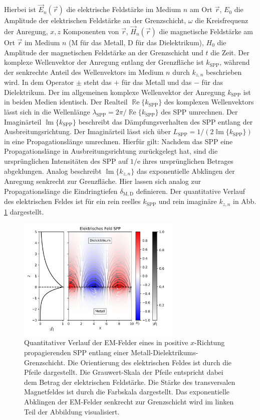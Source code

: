 \documentclass[a4paper, titlepage,  ngerman]{book}
\renewcommand{\Re}{\operatorname{\mathbb{R}e}}
\renewcommand{\Im}{\operatorname{\mathbb{I}m}}
\begin{document}
	Hierbei ist $\vec{E}_n(\vec{r})$ die elektrische Feldstärke im Medium $n$ am Ort $\vec{r}$, $E_0$ die Amplitude der elektrischen Feldstärke an der Grenzschicht, $\omega$ die Kreisfrequenz der Anregung, $x, z$ Komponenten von $\vec{r}$, $\vec{H}_n(\vec{r})$ die magnetische Feldstärke am Ort $\vec{r}$ im Medium $n$ ($\mathrm{M}$ für das Metall, $\mathrm{D}$ für das Dielektrikum), $H_0$ die Amplitude der magnetischen Feldstärke an der Grenzschicht und $t$ die Zeit. Der komplexe Wellenvektor der Anregung entlang der Grenzfläche ist $k_{\mathrm{SPP}}$, während der senkrechte Anteil des Wellenvektors im Medium $n$ durch $k_{z,n}$ beschrieben wird.
	In dem Operator $\pm$ steht das $+$ für das Metall und das $-$ für das Dielektrikum. Der im allgemeinen komplexe Wellenvektor der Anregung $k_{\mathrm{SPP}}$ ist in beiden Medien identisch. Der Realteil $\Re\{k_{\mathrm{SPP}}\}$ des komplexen Wellenvektors lässt sich in die Wellenlänge $\lambda_{\mathrm{SPP}} = 2\pi/ \Re\{k_{\mathrm{SPP}}\} $ des SPP umrechnen. Der Imaginärteil $\Im\{k_{\mathrm{SPP}}\}$ beschreibt das Dämpfungsverhalten des SPP entlang der Ausbreitungsrichtung. Der Imaginärteil lässt sich über $L_{\mathrm{SPP}} = 1/(2\Im\{k_{\mathrm{SPP}}\})$ in eine Propagationslänge umrechnen.  Hierfür gilt: Nachdem das SPP eine Propagationslänge in Ausbreitungsrichtung zurückgelegt hat, sind die ursprünglichen Intensitäten des SPP auf $1/\mathrm{e}$ ihres ursprünglichen Betrages abgeklungen. Analog beschreibt $\Im\{k_{z, n}\}$ das exponentielle Abklingen der Anregung senkrecht zur Grenzfläche. Hier lassen sich analog zur Propagationslänge die Eindringtiefen $\delta_{\mathrm{M,D}}$ definieren. Der quantitative Verlauf des elektrischen Feldes ist für ein rein reelles $k_{\mathrm{SPP}}$ und rein imaginäre $k_{z, n}$ in Abb. \ref{fig:electric_field_spp} dargestellt. 
	\begin{figure} 
		\centering
		\includegraphics[width=0.7\textwidth]{figures/E_Feld_SPP.png}
		\caption[Feldorientierung SPP]{Quantitativer Verlauf der EM-Felder eines in positive $x$-Richtung propagierenden SPP entlang einer Metall-Dielektrikums-Grenzschicht. Die Orientierung des elektrischen Feldes ist durch die Pfeile dargestellt. Die Grauwert-Skala der Pfeile entspricht dabei dem Betrag der elektrischen Feldstärke. Die Stärke des transversalen Magnetfeldes ist durch die Farbskala dargestellt. Das exponentielle Abklingen der EM-Felder senkrecht zur Grenzschicht wird im linken Teil der Abbildung visualisiert.}
		\label{fig:electric_field_spp}
	\end{figure}
	
\end{document}

